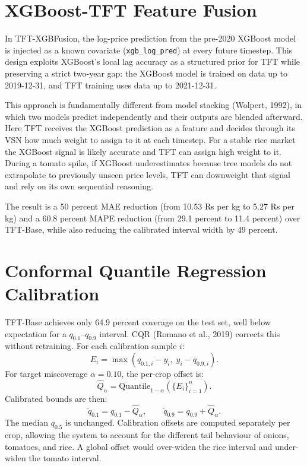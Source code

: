 \documentclass[12pt,a4paper]{report}
\begin{document}
\section{XGBoost-TFT Feature Fusion}

In TFT-XGBFusion, the log-price prediction from the pre-2020 XGBoost model is injected as a
known covariate (\texttt{xgb\_log\_pred}) at every future timestep. This design exploits
XGBoost's local lag accuracy as a structured prior for TFT while preserving a strict
two-year gap: the XGBoost model is trained on data up to 2019-12-31, and TFT training uses
data up to 2021-12-31.

This approach is fundamentally different from model stacking (Wolpert, 1992), in which two
models predict independently and their outputs are blended afterward. Here TFT receives the
XGBoost prediction as a feature and decides through its VSN how much weight to assign to it
at each timestep. For a stable rice market the XGBoost signal is likely accurate and TFT
can assign high weight to it. During a tomato spike, if XGBoost underestimates because tree
models do not extrapolate to previously unseen price levels, TFT can downweight that signal
and rely on its own sequential reasoning.

The result is a 50 percent MAE reduction (from 10.53 Rs per kg to 5.27 Rs per kg) and a
60.8 percent MAPE reduction (from 29.1 percent to 11.4 percent) over TFT-Base, while also
reducing the calibrated interval width by 49 percent.

\section{Conformal Quantile Regression Calibration}

TFT-Base achieves only 64.9 percent coverage on the test set, well below expectation for a
$q_{0.1}$--$q_{0.9}$ interval. CQR (Romano et al., 2019) corrects this without retraining.
For each calibration sample $i$:
\[
E_i = \max\!\left(q_{0.1,i}-y_i,\; y_i-q_{0.9,i}\right).
\]
For target miscoverage $\alpha=0.10$, the per-crop offset is:
\[
\hat{Q}_{\alpha} = \mathrm{Quantile}_{1-\alpha}\!\left(\{E_i\}_{i=1}^{n}\right).
\]
Calibrated bounds are then:
\[
\tilde{q}_{0.1}=q_{0.1}-\hat{Q}_{\alpha},
\qquad
\tilde{q}_{0.9}=q_{0.9}+\hat{Q}_{\alpha}.
\]
The median $q_{0.5}$ is unchanged. Calibration offsets are computed separately per crop,
allowing the system to account for the different tail behaviour of onions, tomatoes, and rice.
A global offset would over-widen the rice interval and under-widen the tomato interval.
\end{document}
